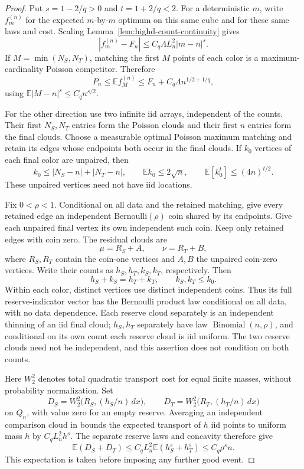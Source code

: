 \documentclass[11pt,reqno]{amsart}
\theoremstyle{definition}
\theoremstyle{remark}
\numberwithin{equation}{section}
\newcommand{\E}{\mathbb E}
\begin{document}
\begin{proof}
Put \(s=1-2/q>0\) and \(t=1+2/q<2\).
For a deterministic \(m\), write \(f_m^{(n)}\) for the expected
\(m\)-by-\(m\) optimum on this same cube and for these same laws
and cost. Scaling Lemma~\ref{lem:highd-count-continuity} gives
\[
|f_m^{(n)}-F_n|\le C_q\Lambda L_n^2|m-n|^s.
\]
If \(M=\min(N_S,N_T)\), matching the first \(M\) points of
each color is a maximum-cardinality Poisson competitor. Therefore
\[
P_n\le\E f_M^{(n)}
 \le F_n+C_q\Lambda n^{1/2+1/q},
\]
using \(\E|M-n|^s\le C_q n^{s/2}\).

For the other direction use two infinite iid arrays, independent of
the counts. Their first \(N_S,N_T\) entries form the Poisson
clouds and their first \(n\) entries form the final clouds. Choose
a measurable optimal Poisson maximum matching and retain its edges
whose endpoints both occur in the final clouds. If \(k_0\) vertices
of each final color are unpaired, then
\[
k_0\le|N_S-n|+|N_T-n|,\qquad
\E k_0\le2\sqrt n,\qquad
\E[k_0^t]\le(4n)^{t/2}.
\]
These unpaired vertices need not have iid locations.

Fix \(0<\rho<1\). Conditional on all data and the retained
matching, give every retained edge an independent Bernoulli\((\rho)\)
coin shared by its endpoints. Give each unpaired final vertex its own
independent such coin. Keep only retained edges with coin zero.
The residual clouds are
\[
\mu=R_S+A,\qquad \nu=R_T+B,
\]
where \(R_S,R_T\) contain the coin-one vertices and \(A,B\)
the unpaired coin-zero vertices. Write their counts as
\(h_S,h_T,k_S,k_T\), respectively. Then
\[
h_S+k_S=h_T+k_T,\qquad k_S,k_T\le k_0.
\]
Within each color, distinct vertices use distinct independent coins.
Thus its full reserve-indicator vector has the Bernoulli product law
conditional on all data, with no data dependence. Each reserve cloud
separately is an independent thinning of an iid final cloud;
\(h_S,h_T\) separately have law \(\operatorname{Binomial}(n,\rho)\),
and conditional on its own count each reserve cloud is iid uniform.
The two reserve clouds need not be independent, and this assertion
does not condition on both counts.

Here \(W_2^2\) denotes total quadratic transport cost for equal
finite masses, without probability normalization. Set
\[
D_S=W_2^2\bigl(R_S,(h_S/n)\,dx\bigr),\qquad
D_T=W_2^2\bigl(R_T,(h_T/n)\,dx\bigr)
\]
on \(Q_n\), with value zero for an empty reserve.
Averaging an independent comparison cloud in
\cite[Theorem~1.1]{GoldmanTrevisan2021} bounds the expected transport
of \(h\) iid points to uniform mass \(h\) by \(C_qL_n^2h^s\).
The separate reserve laws and concavity therefore give
\[
\E(D_S+D_T)\le C_qL_n^2\E(h_S^s+h_T^s)
 \le C_q\rho^s n.
\]
This expectation is taken before imposing any further good event.


\end{proof}
\end{document}
